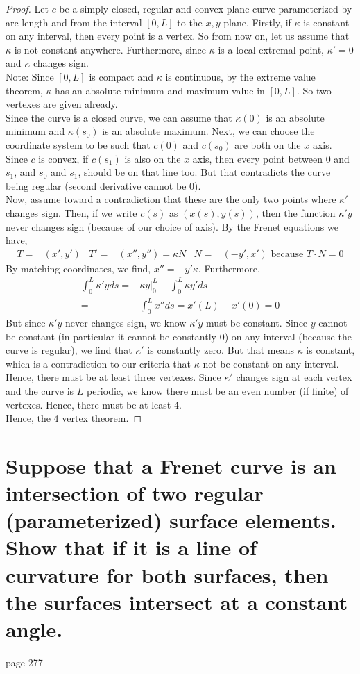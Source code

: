 \documentclass[12pt]{amsart}
\begin{document}
\begin{proof}
	Let $c$ be a simply closed, regular and convex plane curve parameterized by arc length and from the interval $[0,L]$ to the $x,y$ plane. Firstly, if $\kappa$ is constant on any interval, then every point is a vertex. So from now on, let us assume that $\kappa$ is not constant anywhere. Furthermore, since $\kappa$ is a local extremal point, $\kappa'=0$ and $\kappa$ changes sign.
	\\Note: Since $[0,L]$ is compact and $\kappa$ is continuous, by the extreme value theorem, $\kappa$ has an absolute minimum and maximum value in $[0,L]$. So two vertexes are given already.
	\\Since the curve is a closed curve, we can assume that $\kappa(0)$ is an absolute minimum and $\kappa(s_0)$ is an absolute maximum. Next, we can choose the coordinate system to be such that $c(0)$ and $c(s_0)$ are both on the $x$ axis. Since $c$ is convex, if $c(s_1)$ is also on the $x$ axis, then every point between $0$ and $s_1$, and $s_0$ and $s_1$, should be on that line too. But that contradicts the curve being regular (second derivative cannot be 0).
	\\Now, assume toward a contradiction that these are the only two points where $\kappa'$ changes sign. Then, if we write $c(s)$ as $(x(s),y(s))$, then the function $\kappa'y$ never changes sign (because of our choice of axis). By the Frenet equations we have,
	\begin{align*}
		T=&(x',y') & T'=&(x'',y'')=\kappa N & N=&(-y',x')\text{ because $T\cdot N=0$}
	\end{align*}
	By matching coordinates, we find, $x''=-y'\kappa$. Furthermore,
	\begin{align*}
		\int_0^L\kappa'yds=&\kappa y|_0^L-\int_0^L\kappa y'ds
		\\=&\int_0^Lx''ds=x'(L)-x'(0)=0
	\end{align*}
	But since $\kappa'y$ never changes sign, we know $\kappa'y$ must be constant. Since $y$ cannot be constant (in particular it cannot be constantly 0) on any interval (because the curve is regular), we find that $\kappa'$ is constantly zero. But that means $\kappa$ is constant, which is a contradiction to our criteria that $\kappa$ not be constant on any interval.
	\\Hence, there must be at least three vertexes. Since $\kappa'$ changes sign at each vertex and the curve is $L$ periodic, we know there must be an even number (if finite) of vertexes. Hence, there must be at least 4.
	\\Hence, the 4 vertex theorem.
\end{proof}

\newpage
\section{Suppose that a Frenet curve is an intersection of two regular (parameterized) surface elements. Show that if it is a line of curvature for both surfaces, then the surfaces intersect at a constant angle.}
page 277
\end{document}
